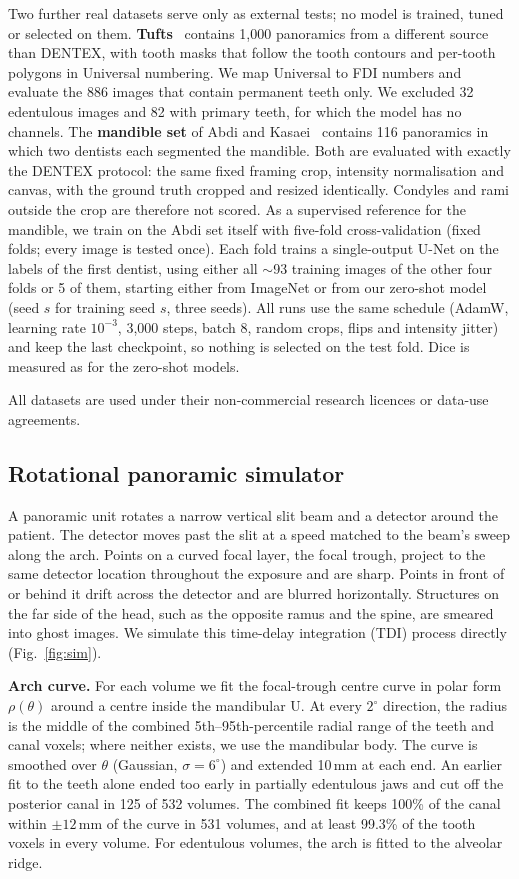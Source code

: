 \documentclass[preprint,12pt]{elsarticle}
\begin{document}
Two further real datasets serve only as external tests; no model is trained, tuned or selected on them.
\textbf{Tufts}~\cite{panetta2022} contains 1,000 panoramics from a different source than DENTEX, with tooth masks that
follow the tooth contours and per-tooth polygons in Universal numbering. We map
Universal to FDI numbers and evaluate the 886 images that contain permanent teeth only. We excluded 32 edentulous
images and 82 with primary teeth, for which the model has no channels. The \textbf{mandible set} of Abdi and
Kasaei~\cite{abdi2015,abdi2020data} contains 116 panoramics in which two dentists each segmented the mandible. Both are
evaluated with exactly the DENTEX protocol: the same fixed framing crop, intensity normalisation and canvas, with the
ground truth cropped and resized identically. Condyles and rami outside the crop are therefore not scored.
As a supervised reference for the mandible, we train on the Abdi set itself with five-fold cross-validation (fixed
folds; every image is tested once). Each fold trains a single-output U-Net on the labels of the first dentist, using
either all ${\sim}$93 training images of the other four folds or 5 of them, starting either from ImageNet or from our
zero-shot model (seed $s$ for training seed $s$, three seeds). All runs use the same schedule (AdamW, learning rate
$10^{-3}$, 3,000 steps, batch 8, random crops, flips and intensity jitter) and keep the last checkpoint, so nothing is
selected on the test fold. Dice is measured as for the zero-shot models.

All datasets are used under their non-commercial research licences or data-use agreements.

\subsection{Rotational panoramic simulator}
A panoramic unit rotates a narrow vertical slit beam and a detector around the patient. The detector moves past the slit
at a speed matched to the beam's sweep along the arch. Points on a curved focal layer, the focal trough, project to the
same detector location throughout the exposure and are sharp. Points in front of or behind it drift across the detector
and are blurred horizontally. Structures on the far side of the head, such as the opposite ramus and the spine, are
smeared into ghost images. We simulate this time-delay integration (TDI) process directly (Fig.~\ref{fig:sim}).

\textbf{Arch curve.} For each volume we fit the focal-trough centre curve in polar form $\rho(\theta)$ around a centre
inside the mandibular U. At every $2^\circ$ direction, the radius is the middle of the combined 5th--95th-percentile
radial range of the teeth and canal voxels; where neither exists, we use the mandibular body. The curve is smoothed over
$\theta$ (Gaussian, $\sigma = 6^\circ$) and extended 10\,mm at each end. An earlier fit to the teeth alone ended too
early in partially edentulous jaws and cut off the posterior canal in 125 of 532 volumes. The combined fit keeps 100\% of
the canal within $\pm12$\,mm of the curve in 531 volumes, and at least 99.3\% of the tooth voxels in every volume. For
edentulous volumes, the arch is fitted to the alveolar ridge.
\end{document}
